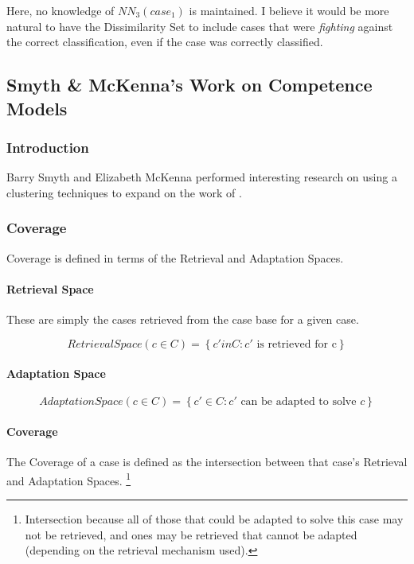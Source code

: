 \documentclass[a4paper,11pt]{report}
\begin{document}
Here, no knowledge of $NN_{3}(case_{1})$ is maintained. I believe it would be more natural to have the Dissimilarity Set to include cases that were \emph{fighting} against the correct classification, even if the case was correctly classified.

\subsection{Smyth \& McKenna's Work on Competence Models}
\subsubsection{Introduction}
Barry Smyth and Elizabeth McKenna performed interesting research on using a clustering techniques to expand on the work of \citet{Smyth1995} \cite{Smyth1998}.

\subsubsection{Coverage}
Coverage is defined in terms of the Retrieval and Adaptation Spaces.

\paragraph{Retrieval Space}

These are simply the cases retrieved from the case base for a given case.

\[ RetrievalSpace(c \in C) = \left\{ c' in C : c' \text{ is retrieved for c} \right\} \]

\paragraph{Adaptation Space}

\[ AdaptationSpace(c \in C) = \left\{ c' \in C : c' \text{ can be adapted to solve } c \right\} \]

\paragraph{Coverage}

The Coverage of a case is defined as the intersection between that case's Retrieval and Adaptation Spaces. \footnote{Intersection because all of those that could be adapted to solve this case may not be retrieved, and ones may be retrieved that cannot be adapted (depending on the retrieval mechanism used).}
\end{document}
